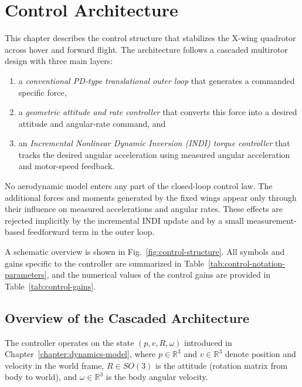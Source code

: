 
\chapter{Control Architecture}\label{chapter:control-architecture}

This chapter describes the control structure that stabilizes the X-wing quadrotor
across hover and forward flight. The architecture follows a cascaded multirotor
design with three main layers:

\begin{enumerate}
    \item a \emph{conventional PD-type translational outer loop} that generates a commanded
          specific force,
    \item a \emph{geometric attitude and rate controller} that converts this
          force into a desired attitude and angular-rate command, and
    \item an \emph{Incremental Nonlinear Dynamic Inversion (INDI) torque controller}
          that tracks the desired angular acceleration using measured angular acceleration
          and motor-speed feedback.
\end{enumerate}

No aerodynamic model enters any part of the closed-loop control law. The additional
forces and moments generated by the fixed wings appear only through their influence
on measured accelerations and angular rates. These effects are rejected implicitly
by the incremental INDI update and by a small measurement-based feedforward term
in the outer loop.

A schematic overview is shown in Fig.~\ref{fig:control-structure}. All symbols and
gains specific to the controller are summarized in
Table~\ref{tab:control-notation-parameters}, and the numerical values of the
control gains are provided in Table~\ref{tab:control-gains}.

\section{Overview of the Cascaded Architecture}

The controller operates on the state $(p, v, R, \omega)$ introduced in
Chapter~\ref{chapter:dynamics-model}, where $p \in \mathbb{R}^3$ and $v \in \mathbb{R}^3$
denote position and velocity in the world frame, $R \in SO(3)$ is the attitude
(rotation matrix from body to world), and $\omega \in \mathbb{R}^3$ is the body
angular velocity.

